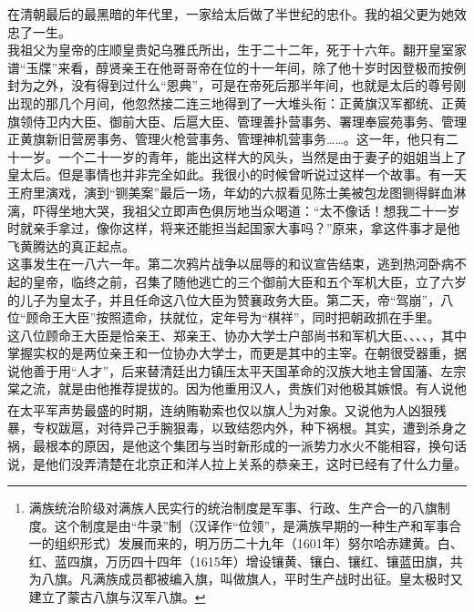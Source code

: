   在清朝最后的最黑暗的年代里，一家给太后做了半世纪的忠仆。我的祖父更为她效忠了一生。\\

  我祖父为皇帝的庄顺皇贵妃乌雅氏所出，生于二十二年，死于十六年。翻开皇室家谱“玉牒”来看，醇贤亲王在他哥哥帝在位的十一年间，除了他十岁时因登极而按例封为之外，没有得到过什么“恩典”，可是在帝死后那半年间，也就是太后的尊号刚出现的那几个月间，他忽然接二连三地得到了一大堆头衔：正黄旗汉军都统、正黄旗领侍卫内大臣、御前大臣、后扈大臣、管理善扑营事务、署理奉宸苑事务、管理正黄旗新旧营房事务、管理火枪营事务、管理神机营事务……。这一年，他只有二十一岁。一个二十一岁的青年，能出这样大的风头，当然是由于妻子的姐姐当上了皇太后。但是事情也并非完全如此。我很小的时候曾听说过这样一个故事。有一天王府里演戏，演到“铡美案”最后一场，年幼的六叔看见陈士美被包龙图铡得鲜血淋漓，吓得坐地大哭，我祖父立即声色俱厉地当众喝道：“太不像话！想我二十一岁时就亲手拿过，像你这样，将来还能担当起国家大事吗？”原来，拿这件事才是他飞黄腾达的真正起点。\\

  这事发生在一八六一年。第二次鸦片战争以屈辱的和议宣告结束，逃到热河卧病不起的皇帝，临终之前，召集了随他逃亡的三个御前大臣和五个军机大臣，立了六岁的儿子为皇太子，并且任命这八位大臣为赞襄政务大臣。第二天，帝“驾崩”，八位“顾命王大臣”按照遗命，扶就位，定年号为“棋祥”，同时把朝政抓在手里。\\

  这八位顾命王大臣是恰亲王、郑亲王、协办大学士户部尚书和军机大臣、、、、，其中掌握实权的是两位亲王和一位协办大学士，而更是其中的主宰。在朝很受器重，据说他善于用“人才”，后来替清廷出力镇压太平天国革命的汉族大地主曾国藩、左宗棠之流，就是由他推荐提拔的。因为他重用汉人，贵族们对他极其嫉恨。有人说他在太平军声势最盛的时期，连纳贿勒索也仅以旗人\footnote{满族统治阶级对满族人民实行的统治制度是军事、行政、生产合一的八旗制度。这个制度是由“牛录”制（汉译作“位领”，是满族早期的一种生产和军事合一的组织形式）发展而来的，明万历二十九年（1601年）努尔哈赤建黄。白、红、蓝四旗，万历四十四年（1615年）增设镶黄、镶白、镶红、镶蓝田旗，共为八旗。凡满族成员都被编入旗，叫做旗人，平时生产战时出征。皇太极时又建立了蒙古八旗与汉军八旗。}为对象。又说他为人凶狠残暴，专权跋扈，对待异己手腕狠毒，以致结怨内外，种下祸根。其实，遭到杀身之祸，最根本的原因，是他这个集团与当时新形成的一派势力水火不能相容，换句话说，是他们没弄清楚在北京正和洋人拉上关系的恭亲王，这时已经有了什么力量。\\


